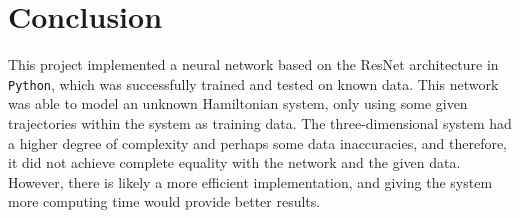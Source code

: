 \documentclass{article}
\begin{document}
\section{Conclusion}
This project implemented a neural network based on the ResNet architecture in \verb|Python|, which was successfully trained and tested on known data. This network was able to model an unknown Hamiltonian system, only using some given trajectories within the system as training data. The three-dimensional system had a higher degree of complexity and perhaps some data inaccuracies, and therefore, it did not achieve complete equality with the network and the given data. However, there is likely a more efficient implementation, and giving the system more computing time would provide better results.

\printbibliography
\end{document}
